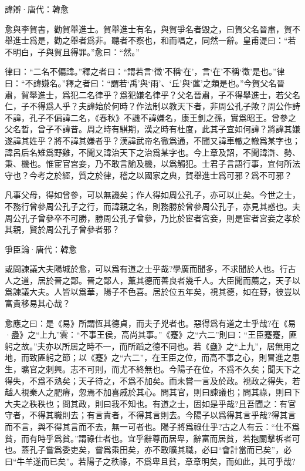 \documentclass[12pt,a4paper]{ctexbook}
\begin{document}
諱辯·唐代：韓愈 \par
愈與李賀書，勸賀舉進士。賀舉進士有名，與賀爭名者毀之，曰賀父名晉肅，賀不舉進士爲是，勸之舉者爲非。聽者不察也，和而唱之，同然一辭。皇甫湜曰：“若不明白，子與賀且得罪。”愈曰：“然。”\par
律曰：“二名不偏諱。”釋之者曰：“謂若言‘徵’不稱‘在’，言‘在’不稱‘徵’是也。”律曰：“不諱嫌名。”釋之者曰：“謂若‘禹’與‘雨’、‘丘’與‘蓲’之類是也。”今賀父名晉肅，賀舉進士，爲犯二名律乎？爲犯嫌名律乎？父名晉肅，子不得舉進士，若父名仁，子不得爲人乎？夫諱始於何時？作法制以教天下者，非周公孔子歟？周公作詩不諱，孔子不偏諱二名，《春秋》不譏不諱嫌名，康王釗之孫，實爲昭王。曾參之父名晳，曾子不諱昔。周之時有騏期，漢之時有杜度，此其子宜如何諱？將諱其嫌遂諱其姓乎？將不諱其嫌者乎？漢諱武帝名徹爲通，不聞又諱車轍之轍爲某字也；諱呂后名雉爲野雞，不聞又諱治天下之治爲某字也。今上章及詔，不聞諱滸、勢、秉、機也。惟宦官宮妾，乃不敢言諭及機，以爲觸犯。士君子言語行事，宜何所法守也？今考之於經，質之於律，稽之以國家之典，賀舉進士爲可邪？爲不可邪？\par
凡事父母，得如曾參，可以無譏矣；作人得如周公孔子，亦可以止矣。今世之士，不務行曾參周公孔子之行，而諱親之名，則務勝於曾參周公孔子，亦見其惑也。夫周公孔子曾參卒不可勝，勝周公孔子曾參，乃比於宦者宮妾，則是宦者宮妾之孝於其親，賢於周公孔子曾參者邪？\par
爭臣論·唐代：韓愈 \par
或問諫議大夫陽城於愈，可以爲有道之士乎哉?學廣而聞多，不求聞於人也。行古人之道，居於晉之鄙。晉之鄙人，薰其德而善良者幾千人。大臣聞而薦之，天子以爲諫議大夫。人皆以爲華，陽子不色喜。居於位五年矣，視其德，如在野，彼豈以富貴移易其心哉？\par
愈應之曰：是《易》所謂恆其德貞，而夫子兇者也。惡得爲有道之士乎哉?在《易·蠱》之“上九”雲：“不事王侯，高尚其事。”《蹇》之“六二”則曰：“王臣蹇蹇，匪躬之故。”夫亦以所居之時不一，而所蹈之德不同也。若《蠱》之“上九”，居無用之地，而致匪躬之節；以《蹇》之“六二”，在王臣之位，而高不事之心，則冒進之患生，曠官之刺興。志不可則，而尤不終無也。今陽子在位，不爲不久矣；聞天下之得失，不爲不熟矣；天子待之，不爲不加矣。而未嘗一言及於政。視政之得失，若越人視秦人之肥瘠，忽焉不加喜戚於其心。問其官，則曰諫議也；問其祿，則曰下大夫之秩秩也；問其政，則曰我不知也。有道之士，固如是乎哉?且吾聞之：有官守者，不得其職則去；有言責者，不得其言則去。今陽子以爲得其言乎哉?得其言而不言，與不得其言而不去，無一可者也。陽子將爲祿仕乎?古之人有云：“仕不爲貧，而有時乎爲貧。”謂祿仕者也。宜乎辭尊而居卑，辭富而居貧，若抱關擊柝者可也。蓋孔子嘗爲委吏矣，嘗爲乘田矣，亦不敢曠其職，必曰“會計當而已矣”，必曰“牛羊遂而已矣”。若陽子之秩祿，不爲卑且貧，章章明矣，而如此，其可乎哉?\par
\end{document}
